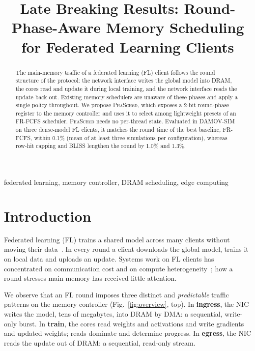 \documentclass[conference]{IEEEtran}
\newcommand{\name}{\textsc{PhaSched}}
\begin{document}
\title{Late Breaking Results: Round-Phase-Aware Memory Scheduling for Federated Learning Clients}

\author{
}

\maketitle

\begin{abstract}
The main-memory traffic of a federated learning (FL) client follows the round structure of the protocol: the network interface writes the global model into DRAM, the cores read and update it during local training, and the network interface reads the update back out. Existing memory schedulers are unaware of these phases and apply a single policy throughout. We propose \name{}, which exposes a 2-bit round-phase register to the memory controller and uses it to select among lightweight presets of an FR-FCFS scheduler. \name{} needs no per-thread state. Evaluated in DAMOV-SIM on three dense-model FL clients, it matches the round time of the best baseline, FR-FCFS, within 0.1\% (mean of at least three simulations per configuration), whereas row-hit capping and BLISS lengthen the round by 1.0\% and 1.3\%.
\end{abstract}

\begin{IEEEkeywords}
federated learning, memory controller, DRAM scheduling, edge computing
\end{IEEEkeywords}

\section{Introduction}
Federated learning (FL) trains a shared model across many clients without moving their data~\cite{fedavg}. In every round a client downloads the global model, trains it on local data and uploads an update. Systems work on FL clients has concentrated on communication cost and on compute heterogeneity~\cite{flscale,flopen}; how a round stresses main memory has received little attention.

We observe that an FL round imposes three distinct and \emph{predictable} traffic patterns on the memory controller (Fig.~\ref{fig:overview}, top). In \textbf{ingress}, the NIC writes the model, tens of megabytes, into DRAM by DMA: a sequential, write-only burst. In \textbf{train}, the cores read weights and activations and write gradients and updated weights; reads dominate and determine progress. In \textbf{egress}, the NIC reads the update out of DRAM: a sequential, read-only stream.
\end{document}
